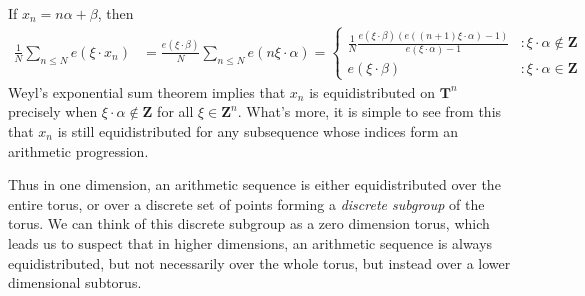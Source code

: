 \begin{example}
    If $x_n = n \alpha + \beta$, then
    \begin{align*}
        \frac{1}{N} \sum_{n \leq N} e(\xi \cdot x_n) &= \frac{e(\xi \cdot \beta)}{N} \sum_{n \leq N} e(n \xi \cdot \alpha) = \begin{cases} \frac{1}{N} \frac{e(\xi \cdot \beta)(e((n+1) \xi \cdot \alpha) - 1)}{e(\xi \cdot \alpha) - 1} & : \xi \cdot \alpha \not \in \mathbf{Z} \\ e(\xi \cdot \beta) & : \xi \cdot \alpha \in \mathbf{Z} \end{cases}
    \end{align*}
    Weyl's exponential sum theorem implies that $x_n$ is equidistributed on $\mathbf{T}^n$ precisely when $\xi \cdot \alpha \not \in \mathbf{Z}$ for all $\xi \in \mathbf{Z}^n$. What's more, it is simple to see from this that $x_n$ is still equidistributed for any subsequence whose indices form an arithmetic progression.
\end{example}

Thus in one dimension, an arithmetic sequence is either equidistributed over the entire torus, or over a discrete set of points forming a {\it discrete subgroup} of the torus. We can think of this discrete subgroup as a zero dimension torus, which leads us to suspect that in higher dimensions, an arithmetic sequence is always equidistributed, but not necessarily over the whole torus, but instead over a lower dimensional subtorus.

